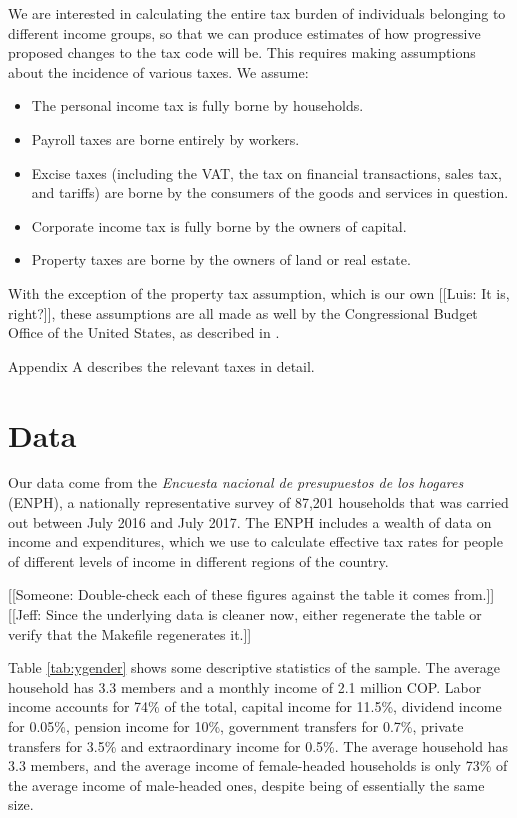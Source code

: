\documentclass[12pt]{article}
\begin{document}
We are interested in calculating
the entire tax burden of individuals belonging to different income groups,
so that we can produce estimates of how progressive proposed changes to the tax code will be.
This requires making assumptions about the incidence of various taxes. We assume:

\begin{itemize}
  \item The personal income tax is fully borne by households.
  \item Payroll taxes are borne entirely by workers.
  \item Excise taxes
  (including the VAT, the tax on financial transactions, sales tax, and tariffs)
  are borne by the consumers of the goods and services in question.
  \item Corporate income tax is fully borne by the owners of capital.
  \item Property taxes are borne by
  the owners of land or real estate.
\end{itemize}

With the exception of the property tax assumption,
which is our own [[Luis: It is, right?]],
these assumptions are all made as well by
the Congressional Budget Office of the United States,
as described in \citet{salanie}.

Appendix A describes the relevant taxes in detail.

\section{Data}
Our data come from the
\textit{Encuesta nacional de presupuestos de los hogares} (ENPH),
a nationally representative survey of 87,201 households
that was carried out between July 2016 and July 2017.
The ENPH includes a wealth of data on income and expenditures,
which we use to calculate effective tax rates for
people of different levels of income in different regions of the country.


[[Someone:
    Double-check each of these figures
    against the table it comes from.]]
[[Jeff:
    Since the underlying data is cleaner now,
    either regenerate the table
    or verify that the Makefile regenerates it.]]

Table \ref{tab:ygender} shows some descriptive statistics of the sample.
The average household has 3.3 members and a monthly income of 2.1 million COP.
Labor income accounts for 74\% of the total,
capital income for 11.5\%,
dividend income for 0.05\%,
pension income for 10\%,
government transfers for 0.7\%,
private transfers for 3.5\%
and extraordinary income for 0.5\%.
The average household has 3.3 members,
and the average income of female-headed households
is only 73\% of the average income of male-headed ones,
despite being of essentially the same size.
\end{document}
